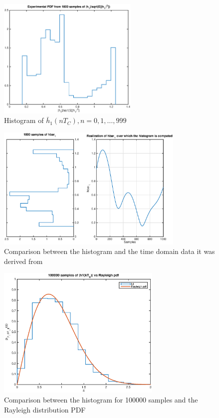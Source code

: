 \documentclass[10pt]{article}
\begin{document}
\begin{figure}[h!]
  \centering
  \includegraphics[width = 0.6\textwidth]{p01_h1hist}
  \caption{Histogram of $\bar{h}_1(nT_C), n = 0, 1, \dots, 999$}
  \label{fig:h1hist}
\end{figure}

\begin{figure}[h!]
  \centering
  \includegraphics[width = 0.8\textwidth]{p02_h1hist}
  \caption{Comparison between the histogram and the time domain data it was derived from}
  \label{fig:h1histvstime}
\end{figure}

\begin{figure}[h!]
  \centering
  \includegraphics[width = 0.7\textwidth]{p04_h1hist}
  \caption{Comparison between the histogram for 100000 samples and the Rayleigh distribution PDF}
  \label{fig:h1hist100000}
\end{figure}
\end{document}
